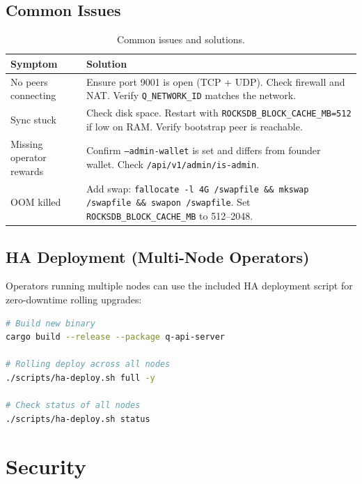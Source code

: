 \documentclass[11pt,a4paper]{article}
\begin{document}
\subsection{Common Issues}

\begin{table}[H]
\centering
\small
\begin{tabular}{@{}lp{8cm}@{}}
\toprule
\textbf{Symptom} & \textbf{Solution} \\
\midrule
No peers connecting &
    Ensure port 9001 is open (TCP + UDP). Check firewall and NAT.
    Verify \texttt{Q\_NETWORK\_ID} matches the network. \\
Sync stuck &
    Check disk space. Restart with \texttt{ROCKSDB\_BLOCK\_CACHE\_MB=512} if
    low on RAM. Verify bootstrap peer is reachable. \\
Missing operator rewards &
    Confirm \texttt{--admin-wallet} is set and differs from founder wallet.
    Check \texttt{/api/v1/admin/is-admin}. \\
OOM killed &
    Add swap: \texttt{fallocate -l 4G /swapfile \&\& mkswap /swapfile \&\& swapon /swapfile}.
    Set \texttt{ROCKSDB\_BLOCK\_CACHE\_MB} to 512--2048. \\
\bottomrule
\end{tabular}
\caption{Common issues and solutions.}
\end{table}

\subsection{HA Deployment (Multi-Node Operators)}

Operators running multiple nodes can use the included HA deployment script
for zero-downtime rolling upgrades:

\begin{lstlisting}[language=bash,title={Rolling upgrade}]
# Build new binary
cargo build --release --package q-api-server

# Rolling deploy across all nodes
./scripts/ha-deploy.sh full -y

# Check status of all nodes
./scripts/ha-deploy.sh status
\end{lstlisting}

\section{Security}
\end{document}
